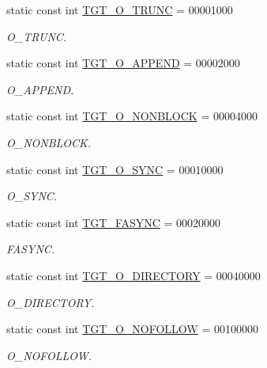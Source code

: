 \begin{Indent}{\bf }
\begin{DoxyCompactItemize}
static const int \hyperlink{classPowerLinux_a4f892ee6e1424a2becd859b0bef1f18b}{TGT\_\-O\_\-TRUNC} = 00001000
\begin{DoxyCompactList}\small\item\em O\_\-TRUNC. \item\end{DoxyCompactList}\item 
static const int \hyperlink{classPowerLinux_af11adc5404ea3780a5ce2829cc3710b7}{TGT\_\-O\_\-APPEND} = 00002000
\begin{DoxyCompactList}\small\item\em O\_\-APPEND. \item\end{DoxyCompactList}\item 
static const int \hyperlink{classPowerLinux_a0ea5420b4c9b45ba342a266fb77ac942}{TGT\_\-O\_\-NONBLOCK} = 00004000
\begin{DoxyCompactList}\small\item\em O\_\-NONBLOCK. \item\end{DoxyCompactList}\item 
static const int \hyperlink{classPowerLinux_abf43ab05d2a5b6b8113952160d8565db}{TGT\_\-O\_\-SYNC} = 00010000
\begin{DoxyCompactList}\small\item\em O\_\-SYNC. \item\end{DoxyCompactList}\item 
static const int \hyperlink{classPowerLinux_ab23d73086673a1279fc508b68fc47191}{TGT\_\-FASYNC} = 00020000
\begin{DoxyCompactList}\small\item\em FASYNC. \item\end{DoxyCompactList}\item 
static const int \hyperlink{classPowerLinux_a1f10d158ad65ad6389078ba44629788a}{TGT\_\-O\_\-DIRECTORY} = 00040000
\begin{DoxyCompactList}\small\item\em O\_\-DIRECTORY. \item\end{DoxyCompactList}\item 
static const int \hyperlink{classPowerLinux_a9c27f68ab31ddfdd3e35800ea1f02a89}{TGT\_\-O\_\-NOFOLLOW} = 00100000
\begin{DoxyCompactList}\small\item\em O\_\-NOFOLLOW. \item\end{DoxyCompactList}\item 

\end{DoxyCompactItemize}
\end{Indent}
